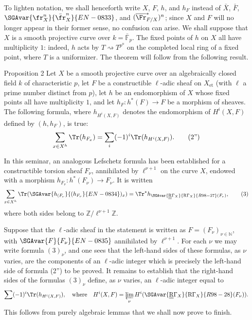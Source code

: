 To lighten notation, we shall henceforth write $X$, $F$, $h$, and $h_F$ instead of $\bar X$, $\bar F$, $\SGAvar{{\fr}_X^n}{\bar{\fr}_X^n}{EN-0833}$, and $(\overline{\Fr}^*_{F/X})^n$; since $X$ and $F$ will no longer appear in their former sense, no confusion can arise. We shall suppose that $X$ is a smooth projective curve over $k=\bar{\mathbb F}_p$. The fixed points of $h$ on $X$ all have multiplicity $1$: indeed, $h$ acts by $T\rightsquigarrow T^{p^n}$ on the completed local ring of a fixed point, where $T$ is a uniformizer. The theorem will follow from the following result.

\begin{statement}{Proposition 2}
Let $X$ be a smooth projective curve over an algebraically closed field $k$ of characteristic $p$, let $F$ be a constructible $\ell$-adic sheaf on $X_{\mathrm{et}}$ (with $\ell$ a prime number distinct from $p$), let $h$ be an endomorphism of $X$ whose fixed points all have multiplicity $1$, and let $h_F:h^*(F)\to F$ be a morphism of sheaves. The following formula, where $h_{H^i(X,F)}$ denotes the endomorphism of $H^i(X,F)$ defined by $(h,h_F)$, is true:
\[
\sum_{x\in X^h}\Tr(h_{F_x})=\sum_i(-1)^i\Tr(h_{H^i(X,F)}).
\tag{2''}
\]
\end{statement}

In this seminar, an analogous Lefschetz formula has been established for a constructible torsion sheaf $F_\nu$, annihilated by $\ell^{\nu+1}$ on the curve $X$, endowed with a morphism $h_{F_\nu}:h^*(F_\nu)\to F_\nu$. It is written
\[
\sum_{x\in X^h}\Tr(\SGAvar{h_{(F_\nu}}{(h_{F_\nu}}{EN-0834})_x)=\Tr^*h_{\SGAvar{\underline{\underline{\mathrm{R}}}\Gamma_X}{\mathrm{R}\Gamma_X}{R98-27}(F_\nu)},
\tag{3}
\]
where both sides belong to $\mathbb Z/\ell^{\nu+1}\mathbb Z$.

Suppose that the $\ell$-adic sheaf in the statement is written as $F=(F_\nu)_{\nu\in\mathbb N}$, with $\SGAvar{F}{F_\nu}{EN-0835}$ annihilated by $\ell^{\nu+1}$. For each $\nu$ we may write formula $(3)_\nu$, and one sees that the left-hand sides of these formulas, as $\nu$ varies, are the components of an $\ell$-adic integer which is precisely the left-hand side of formula (2'') to be proved. It remains to establish that the right-hand sides of the formulas $(3)_\nu$ define, as $\nu$ varies, an $\ell$-adic integer equal to
\[
\sum(-1)^i\Tr(h_{H^i(X,F)}),
\quad\text{where}\quad
H^i(X,F)=\varprojlim_\nu H^i(\SGAvar{\underline{\underline{\mathrm{R}}}\Gamma_X}{\mathrm{R}\Gamma_X}{R98-28}(F_\nu)).
\]
This follows from purely algebraic lemmas that we shall now prove to finish.

